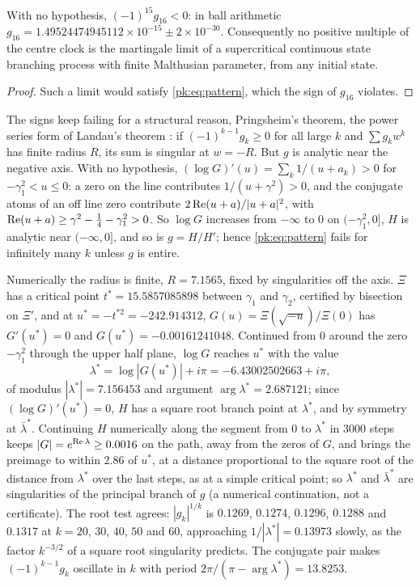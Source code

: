 \begin{theorem}\label{pk:thm:nobranch}
With no hypothesis, $(-1)^{15}g_{16}<0$: in ball arithmetic $g_{16}=1.49524474945112\times10^{-15}\pm2\times10^{-30}$. Consequently no positive multiple of the centre clock is the martingale limit of a supercritical continuous state branching process with finite Malthusian parameter, from any initial state.
\end{theorem}

\begin{proof}
Such a limit would satisfy \eqref{pk:eq:pattern}, which the sign of $g_{16}$ violates.
\end{proof}

The signs keep failing for a structural reason, Pringsheim's theorem, the power series form of Landau's theorem \cite[Chapter~II, Theorem~5b]{Widder41}: if $(-1)^{k-1}g_k\ge0$ for all large $k$ and $\sum g_kw^k$ has finite radius $R$, its sum is singular at $w=-R$. But $g$ is analytic near the negative axis. With no hypothesis, $(\log G)'(u)=\sum_k1/(u+a_k)>0$ for $-\gamma_1^2<u\le0$: a zero on the line contributes $1/(u+\gamma^2)>0$, and the conjugate atoms of an off line zero contribute $2\operatorname{Re}(u+a)/|u+a|^2$, with $\operatorname{Re}(u+a)\ge\gamma^2-\frac14-\gamma_1^2>0$. So $\log G$ increases from $-\infty$ to $0$ on $(-\gamma_1^2,0]$, $H$ is analytic near $(-\infty,0]$, and so is $g=H/H'$; hence \eqref{pk:eq:pattern} fails for infinitely many $k$ unless $g$ is entire.

Numerically the radius is finite, $R=7.1565$, fixed by singularities off the axis. $\Xi$ has a critical point $t^*=15.5857085898$ between $\gamma_1$ and $\gamma_2$, certified by bisection on $\Xi'$, and at $u^*=-t^{*2}=-242.914312$, $G(u)=\Xi(\sqrt{-u})/\Xi(0)$ has $G'(u^*)=0$ and $G(u^*)=-0.00161241048$. Continued from $0$ around the zero $-\gamma_1^2$ through the upper half plane, $\log G$ reaches $u^*$ with the value
\[
\lambda^*=\log|G(u^*)|+i\pi=-6.43002502663+i\pi,
\]
of modulus $|\lambda^*|=7.156453$ and argument $\arg\lambda^*=2.687121$; since $(\log G)'(u^*)=0$, $H$ has a square root branch point at $\lambda^*$, and by symmetry at $\bar\lambda^*$. Continuing $H$ numerically along the segment from $0$ to $\lambda^*$ in $3000$ steps keeps $|G|=e^{\operatorname{Re}\lambda}\ge0.0016$ on the path, away from the zeros of $G$, and brings the preimage to within $2.86$ of $u^*$, at a distance proportional to the square root of the distance from $\lambda^*$ over the last steps, as at a simple critical point; so $\lambda^*$ and $\bar\lambda^*$ are singularities of the principal branch of $g$ (a numerical continuation, not a certificate). The root test agrees: $|g_k|^{1/k}$ is $0.1269$, $0.1274$, $0.1296$, $0.1288$ and $0.1317$ at $k=20$, $30$, $40$, $50$ and $60$, approaching $1/|\lambda^*|=0.13973$ slowly, as the factor $k^{-3/2}$ of a square root singularity predicts. The conjugate pair makes $(-1)^{k-1}g_k$ oscillate in $k$ with period $2\pi/(\pi-\arg\lambda^*)=13.8253$.

